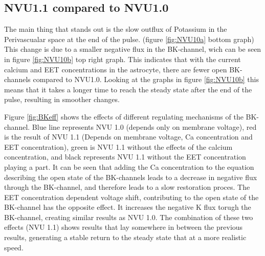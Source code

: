 	
	\subsection{NVU1.1 compared to NVU1.0}
The main thing that stands out is the slow outflux of Potassium in the Perivascualar space at the end of the pulse. (figure \ref{fig:NVU10a} bottom graph) This change is due to a smaller negative flux in the BK-channel, wich can be seen in figure \ref{fig:NVU10b} top right graph. This indicates that with the current calcium and EET  concentrations in the astrocyte, there are fewer open BK-channels compared to NVU1.0. Looking at the graphs in figure \ref{fig:NVU10b} this means that it takes a longer time to reach the steady state after the end of the pulse, resulting in smoother changes. 

Figure \ref{fig:BKeff} shows the effects of different regulating mechanisms of the BK-channel. Blue line represents NVU 1.0 (depends only on membrane voltage), red is the result of NVU 1.1 (Depends on membrane voltage, \gls{Ca} concentration and EET concentration), green is NVU 1.1 without the effects of the calcium concentration, and black represents NVU 1.1 without the EET concentration playing a part. It can be seen that adding the \gls{Ca} concentration to the equation describing the open state of the BK-channels leads to a decrease in negative flux through the BK-channel, and therefore leads to a slow restoration proces. The EET concentration dependent voltage shift, contributing to the open state of the BK-channel has the opposite effect. It increases the negative \gls{K} flux torugh the BK-channel, creating similar results as NVU 1.0. The combination of these two effects (NVU 1.1) shows results that lay somewhere in between the previous results, generating a stable return to the steady state that at a more realistic speed.
	
